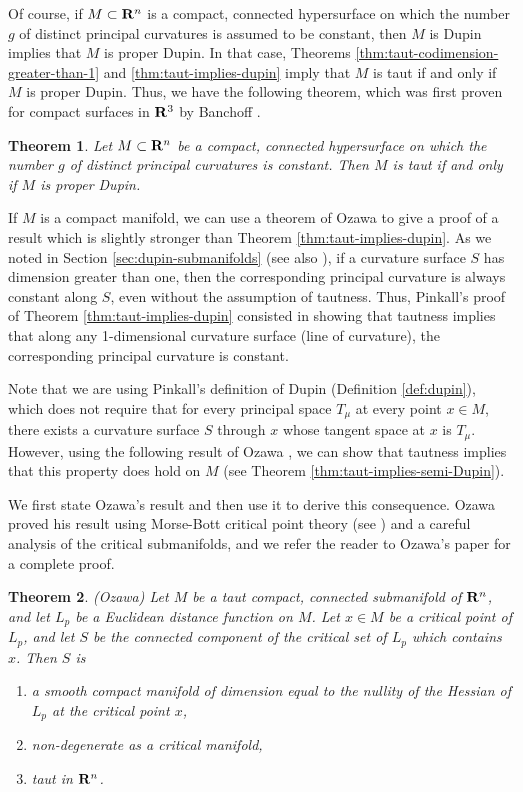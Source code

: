 \documentclass[12pt]{article}
\newtheorem{theorem}{Theorem}[section]
\begin{document}
{Of course, if $M \subset {\bf R}^n$  is a compact, connected hypersurface on which the number $g$ 
of distinct principal curvatures is assumed to be constant, then $M$ is Dupin implies that $M$ is proper Dupin. 
In that case, Theorems \ref{thm:taut-codimension-greater-than-1} and  \ref{thm:taut-implies-dupin}
imply that $M$ is taut if and only if $M$ is proper Dupin.  Thus, we have the following theorem, which was 
first proven for compact surfaces in ${\bf R}^3$ by Banchoff \cite{Ban1}.

\begin{theorem}
\label{thm:taut-dupin}
Let  $M \subset {\bf R}^n$ be a compact, connected hypersurface on which the number $g$ of distinct principal curvatures is constant.  Then $M$ is taut if and only if $M$ is proper Dupin.
\end{theorem}


If $M$ is a compact manifold, we can use a theorem
of Ozawa \cite{Oz} to give a proof of a result which is slightly
stronger than Theorem \ref{thm:taut-implies-dupin}.
As we noted in Section \ref{sec:dupin-submanifolds} (see also \cite[p. 33]{CR8}), 
if a curvature surface $S$ has dimension greater
than one, then the corresponding principal curvature is always
constant along $S$, even without the assumption of tautness.  Thus,
Pinkall's proof of Theorem \ref{thm:taut-implies-dupin}
consisted in showing that tautness implies that along any 1-dimensional curvature surface (line of curvature),
the corresponding principal curvature is constant.

Note that we are using
Pinkall's definition of Dupin (Definition \ref{def:dupin}), which does not require that for
every principal space $T_{\mu}$ at every point $x \in M$, there exists
a curvature surface $S$ through $x$ whose tangent space at $x$
is $T_{\mu}$.  However, using the following result of
Ozawa \cite{Oz}, we can show that tautness implies that this
property does hold on $M$ (see Theorem \ref{thm:taut-implies-semi-Dupin}).  

We first state Ozawa's result
and then use it to derive this consequence.  
Ozawa proved his result using Morse-Bott critical point theory (see \cite{BS})
and a careful analysis of the critical submanifolds, and we refer the reader to Ozawa's paper for a complete proof.

\begin{theorem}{(Ozawa)}
\label{thm:Ozawa}
Let $M$ be a taut compact, connected submanifold of ${\bf R}^n$, 
and let $L_p$ be a Euclidean distance function on $M$.
Let $x \in M$  be a critical point of $L_p$, and let $S$ be the
connected component of the critical set of $L_p$ which contains
$x$.  Then $S$ is
\begin{enumerate}
\item[${\rm(a)}$] a smooth compact manifold of dimension equal to the nullity
of the Hessian of $L_p$ at the critical point $x$,
\item[${\rm(b)}$] non-degenerate as a critical manifold,
\item[${\rm(c)}$] taut in ${\bf R}^n$.
\end{enumerate}
\end{theorem}


}
\end{document}
